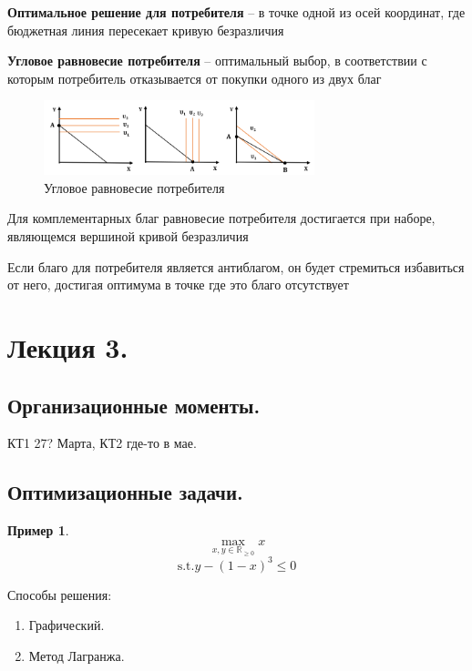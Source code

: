 \documentclass[reqno]{article}
\theoremstyle{definition}
\theoremstyle{definition}
\theoremstyle{definition}
\newtheorem*{exmp}{Пример}
\theoremstyle{definition}
\theoremstyle{definition}
\theoremstyle{definition}
\theoremstyle{definition}
\theoremstyle{definition}
\theoremstyle{definition}
\begin{document}
			\textbf{Оптимальное решение для потребителя} -- в точке одной из осей координат, где бюджетная линия пересекает кривую безразличия
			
			\textbf{Угловое равновесие потребителя} -- оптимальный выбор, в соответствии с которым потребитель отказывается от покупки одного из двух благ
			
			\begin{figure}[h!]
				\centering
				\includegraphics[width=0.7\textwidth]{Угловое_равновесие_потребителя}
				\caption{Угловое равновесие потребителя}
			\end{figure}
			
			Для комплементарных благ равновесие потребителя достигается при наборе, являющемся вершиной кривой безразличия
			
			Если благо для потребителя является антиблагом, он будет стремиться избавиться от него, достигая оптимума в точке где это благо отсутствует
			\newpage
			
	\section{Лекция 3.}
		
		\subsection{Организационные моменты.}
		
		КТ1 27? Марта, КТ2 где-то в мае.
		
		\subsection{Оптимизационные задачи.}
		
			\begin{exmp}
				$$\max_{x,y \in\mathds{R}_{\geq 0}} x$$
				$$\text{s.t.} y - (1 - x)^3 \leq 0$$
			\end{exmp}
		
			Способы решения:
			\begin{enumerate}
				\item Графический.
				\item Метод Лагранжа.
			\end{enumerate}
			
\end{document}
